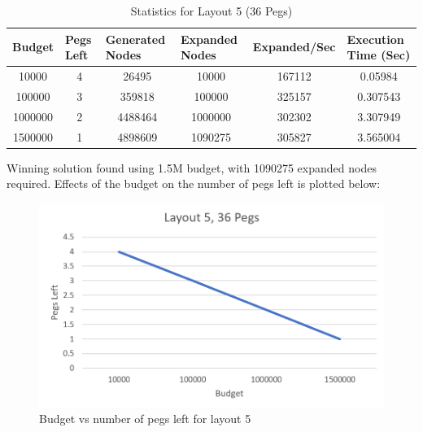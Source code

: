 \documentclass[12pt,a4paper]{article}
\begin{document}
\begin{table}[H]
\caption{Statistics for Layout 5 (36 Pegs)}
\label{tab:my-table}

\begin{tabular}{|c|c|c|c|c|c|}
\hline
Budget  & \multicolumn{1}{l|}{Pegs Left} & \multicolumn{1}{l|}{Generated Nodes} & \multicolumn{1}{l|}{Expanded Nodes} & \multicolumn{1}{l|}{Expanded/Sec} & \multicolumn{1}{l|}{Execution Time (Sec)} \\ \hline
10000   & 4                              & 26495                                & 10000                               & 167112                               & 0.05984                                               \\ \hline
100000  & 3                              & 359818                               & 100000                              & 325157                               & 0.307543                                              \\ \hline
1000000 & 2                              & 4488464                              & 1000000                             & 302302                               & 3.307949                                              \\ \hline
1500000 & 1                              & 4898609                              & 1090275                             & 305827                               & 3.565004                                              \\ \hline
\end{tabular}
\end{table}
Winning solution found using 1.5M budget, with 1090275 expanded nodes required. Effects of the budget on the number of pegs left is plotted below:
\begin{figure}[H]
\centering
\includegraphics[scale=0.5]{layout5.png}
\caption{Budget vs number of pegs left for layout 5}
\end{figure}
\end{document}
